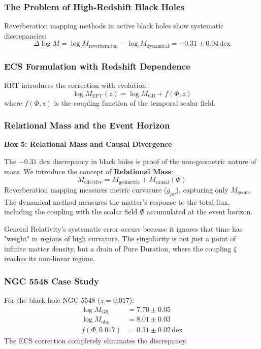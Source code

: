 \documentclass[12pt,a4paper]{article}
\begin{document}
\subsubsection{The Problem of High-Redshift Black Holes}
Reverberation mapping methods in active black holes show systematic discrepancies:
\begin{equation}
    \Delta \log M = \log M_{\text{reverberation}} - \log M_{\text{dynamical}} = -0.31 \pm 0.04 \, \text{dex}
\end{equation}

\subsubsection{ECS Formulation with Redshift Dependence}
RRT introduces the correction with evolution:
\begin{equation}
    \log M_{\text{EFT}}(z) = \log M_{\text{GR}} + f(\Phi, z)
\end{equation}
where $f(\Phi, z)$ is the coupling function of the temporal scalar field.

\subsubsection{Relational Mass and the Event Horizon}
\begin{framed}
\centering
\textbf{Box 5: Relational Mass and Causal Divergence}
\end{framed}

The $-0.31$ dex discrepancy in black holes is proof of the non-geometric nature of mass. We introduce the concept of \textbf{Relational Mass}:
\begin{equation}
    M_{\text{effective}} = M_{\text{geometric}} + M_{\text{causal}}(\Phi)
\end{equation}
Reverberation mapping measures metric curvature ($g_{\mu\nu}$), capturing only $M_{\text{geom}}$. The dynamical method measures the matter's response to the total flux, including the coupling with the scalar field $\Phi$ accumulated at the event horizon. 

General Relativity's systematic error occurs because it ignores that time has "weight" in regions of high curvature. The singularity is not just a point of infinite matter density, but a drain of Pure Duration, where the coupling $\xi$ reaches its non-linear regime.

\subsubsection{NGC 5548 Case Study}
For the black hole NGC 5548 ($z=0.017$):
\begin{align}
    \log M_{\text{GR}} &= 7.70 \pm 0.05 \\
    \log M_{\text{obs}} &= 8.01 \pm 0.03 \\
    f(\Phi, 0.017) &= 0.31 \pm 0.02 \, \text{dex}
\end{align}
The ECS correction completely eliminates the discrepancy.
\end{document}
